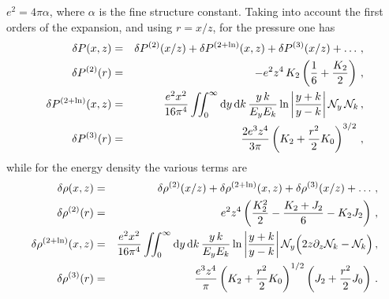 \documentclass[notitlepage,nofootinbib,showpacs,preprintnumbers,amsmath,amssymb,superscriptaddress,prd,onecolumn]{revtex4-1}
\begin{document}
$e^2=4\pi\alpha$, where $\alpha$ is the fine structure constant.
Taking into account the first orders of the expansion, and using $r=x/z$, for the pressure one has \cite{Bennett:2019ewm}
%
\begin{eqnarray}
\delta P(x,z)
&=&
\delta P^{(2)}(x/z)
+
\delta P^{(2+\ln)}(x,z)
+
\delta P^{(3)}(x/z)
+\ldots
\,,
\\
\delta P^{(2)}(r)
&=&
-
e^2 z^4\,K_2
\left(
 \frac{1}{6}
 +\frac{K_2}{2}
\right)
\,,\\
\delta P^{(2+\ln)}(x,z)
&=&
\frac{e^2 x^2}{16\pi^4}
\int\!\!\!\int_0^\infty
{\rm d}y\,
{\rm d}k\,
\frac{y\,k}{E_y E_k}
\ln
\left|
\frac{y+k}{y-k}
\right|
\mathcal{N}_y\,
\mathcal{N}_k
\,,\\
\delta P^{(3)}(r)
&=&
\frac{2e^3z^4}{3\pi}
\left(
K_2
+
\frac{r^2}{2} K_0
\right)^{3/2}
\,,
\end{eqnarray}
while for the energy density the various terms are
\begin{eqnarray}
\delta\rho(x,z)
&=&
\delta\rho^{(2)}(x/z)
+
\delta\rho^{(2+\ln)}(x,z)
+
\delta\rho^{(3)}(x/z)
+\ldots
\,,
\\
\delta\rho^{(2)}(r)
&=&
e^2 z^4
\left(
\frac{K_2^2}{2}
-\frac{K_2+J_2}{6}
-K_2 J_2
\right)
\,,\\
\delta\rho^{(2+\ln)}(x,z)
&=&
\frac{e^2 x^2}{16\pi^4}
\int\!\!\!\int_0^\infty
{\rm d}y\,
{\rm d}k\,
\frac{y\,k}{E_y E_k}
\ln
\left|
\frac{y+k}{y-k}
\right|
\mathcal{N}_y
\Big(
2z \partial_z \mathcal{N}_k
- \mathcal{N}_k
\Big)
\,,\\
\delta\rho^{(3)}(r)
&=&
\frac{e^3z^4}{\pi}
\left(
K_2
+
\frac{r^2}{2} K_0
\right)^{1/2}
\left(
J_2
+
\frac{r^2}{2} J_0
\right)
\,.
\end{eqnarray}
\end{document}
